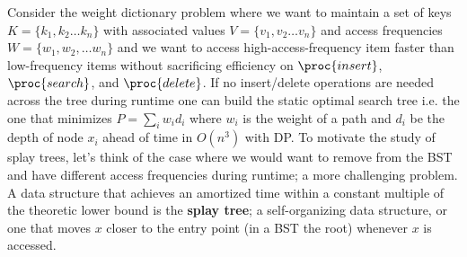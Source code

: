 \documentclass[../notes.tex]{subfiles}
\begin{document}
Consider the weight dictionary problem where we want to maintain a set of keys $ K = \{k_1, k_2 \ldots k_n \}  $ with associated values $ V = \{v_1, v_2 \ldots v_n \}$   and access frequencies $ W = \{w_1, w_2, \ldots w_n \}  $ and we want to access high-access-frequency item faster than low-frequency items without sacrificing efficiency on $ \proc{insert} $, $ \proc{search} $, and $ \proc{delete} $.
If no insert/delete operations are needed across the tree during runtime one can build the static optimal search tree i.e. the one that minimizes $ P = \sum_i w_i d_i $ where $ w_i $ is the weight of a path and $ d_i$ be the depth of node $ x_i $ ahead of time in $ O(n^3) $ with DP.
To motivate the study of splay trees, let's think of the case where we would want to remove from the BST and have different access frequencies during runtime; a more challenging problem.
A data structure that achieves an amortized time within a constant multiple of the theoretic lower bound is the \textbf{splay tree}; a self-organizing data structure, or one that moves $ x $ closer to the entry point (in a BST the root) whenever $ x $ is accessed.
\end{document}
